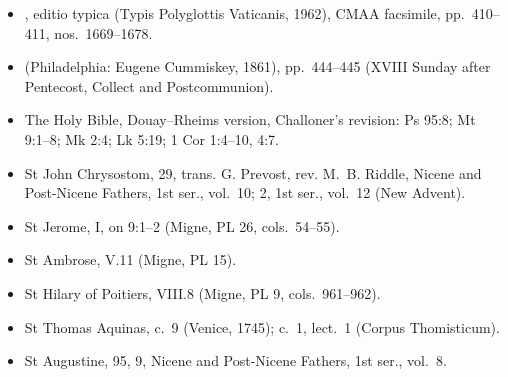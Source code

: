 {\footnotesize
\begin{itemize}\setlength{\itemsep}{0.15em}\setlength{\parskip}{0pt}
\item {}, editio typica (Typis Polyglottis Vaticanis, 1962), CMAA facsimile, pp.~410--411, nos.~1669--1678.
\item {} (Philadelphia: Eugene Cummiskey, 1861), pp.~444--445 (XVIII Sunday after Pentecost, Collect and Postcommunion).
\item The Holy Bible, Douay--Rheims version, Challoner's revision: Ps 95:8; Mt 9:1--8; Mk 2:4; Lk 5:19; 1 Cor 1:4--10, 4:7.
\item St John Chrysostom,  29, trans. G. Prevost, rev. M.~B. Riddle, Nicene and Post-Nicene Fathers, 1st ser., vol.~10;  2, 1st ser., vol.~12 (New Advent).
\item St Jerome,  I, on 9:1--2 (Migne, PL 26, cols.~54--55).
\item St Ambrose,  V.11 (Migne, PL 15).
\item St Hilary of Poitiers,  VIII.8 (Migne, PL 9, cols.~961--962).
\item St Thomas Aquinas,  c.~9 (Venice, 1745);  c.~1, lect.~1 (Corpus Thomisticum).
\item St Augustine,  95, 9, Nicene and Post-Nicene Fathers, 1st ser., vol.~8.
\end{itemize}
\par}
